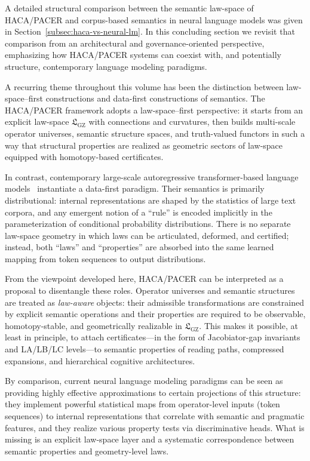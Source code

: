 \documentclass[11pt]{book}
\theoremstyle{plain}
\theoremstyle{definition}
\theoremstyle{remark}
\newcommand{\GZLS}{\ensuremath{\mathfrak{L}_{\mathrm{GZ}}}}       \newcommand{\GZLT}{\ensuremath{M_{!w}}}                           \newcommand{\GZLOC}{\ensuremath{A_M}}                             \newcommand{\GZLC}{\ensuremath{\omega_{\mathrm{law}}}}            \newcommand{\GZLCurv}{\ensuremath{\mathcal{F}_{\mathrm{law}}}}
\begin{document}
A detailed structural comparison between the semantic law-space of
HACA/PACER and corpus-based semantics in neural language models was
given in Section~\ref{subsec:haca-vs-neural-lm}. In this concluding
section we revisit that comparison from an architectural and
governance-oriented perspective, emphasizing how HACA/PACER systems
can coexist with, and potentially structure, contemporary language
modeling paradigms.

A recurring theme throughout this volume has been the distinction between
law-space–first constructions and data-first constructions of semantics.
The HACA/PACER framework adopts a law-space–first perspective: it starts
from an explicit law-space $\GZLS$ with connections and curvatures, then
builds multi-scale operator universes, semantic structure spaces, and
truth-valued functors in such a way that structural properties are
realized as geometric sectors of law-space equipped with homotopy-based
certificates.

In contrast, contemporary large-scale autoregressive transformer-based
language models~\cite{Vaswani2017Attention} instantiate a data-first paradigm. Their semantics is
primarily distributional: internal representations are shaped by the
statistics of large text corpora, and any emergent notion of a ``rule''
is encoded implicitly in the parameterization of conditional probability
distributions. There is no separate law-space geometry in which laws can
be articulated, deformed, and certified; instead, both ``laws'' and
``properties'' are absorbed into the same learned mapping from token
sequences to output distributions.

From the viewpoint developed here, HACA/PACER can be interpreted as a
proposal to disentangle these roles. Operator universes and semantic
structures are treated as \emph{law-aware} objects: their admissible
transformations are constrained by explicit semantic operations and their
properties are required to be observable, homotopy-stable, and
geometrically realizable in $\GZLS$. This makes it possible, at least in
principle, to attach certificates---in the form of Jacobiator-gap
invariants and LA/LB/LC levels---to semantic properties of reading
paths, compressed expansions, and hierarchical cognitive architectures.

By comparison, current neural language modeling paradigms can be seen as
providing highly effective approximations to certain projections of this
structure: they implement powerful statistical maps from operator-level
inputs (token sequences) to internal representations that correlate with
semantic and pragmatic features, and they realize various property tests
via discriminative heads. What is missing is an explicit law-space layer
and a systematic correspondence between semantic properties and
geometry-level laws.
\end{document}
